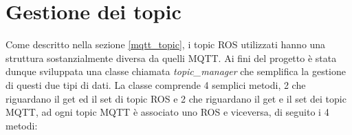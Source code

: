 \section{Gestione dei topic} \label{gestione_dei_topic}
Come descritto nella sezione \ref{mqtt_topic}, i topic ROS utilizzati hanno una struttura sostanzialmente diversa da quelli MQTT. Ai fini del progetto è stata dunque sviluppata una classe chiamata \textit{topic\_manager} che semplifica la gestione di questi due tipi di dati. La classe comprende 4 semplici metodi, 2 che riguardano il get ed il set di topic ROS e 2 che riguardano il get e il set dei topic MQTT, ad ogni topic MQTT è associato uno ROS e viceversa, di seguito i 4 metodi:

